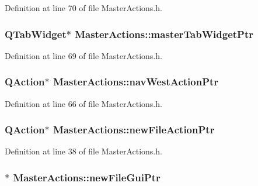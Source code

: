 Definition at line 70 of file Master\-Actions.\-h.

\hypertarget{class_master_actions_a774ef398053050c37d62b7a24e61c7ee}{
\subsubsection[{master\-Tab\-Widget\-Ptr}]{\setlength{\rightskip}{0pt plus 5cm}Q\-Tab\-Widget$\ast$ Master\-Actions\-::master\-Tab\-Widget\-Ptr\hspace{0.3cm}{\ttfamily [private]}}}\label{class_master_actions_a774ef398053050c37d62b7a24e61c7ee}


Definition at line 69 of file Master\-Actions.\-h.

\hypertarget{class_master_actions_af1e3c333e90f4763dfd964aa2321b034}{
\subsubsection[{nav\-West\-Action\-Ptr}]{\setlength{\rightskip}{0pt plus 5cm}Q\-Action$\ast$ Master\-Actions\-::nav\-West\-Action\-Ptr\hspace{0.3cm}{\ttfamily [private]}}}\label{class_master_actions_af1e3c333e90f4763dfd964aa2321b034}


Definition at line 66 of file Master\-Actions.\-h.

\hypertarget{class_master_actions_a4da658e527460b8d5b0a263820259e97}{
\subsubsection[{new\-File\-Action\-Ptr}]{\setlength{\rightskip}{0pt plus 5cm}Q\-Action$\ast$ Master\-Actions\-::new\-File\-Action\-Ptr\hspace{0.3cm}{\ttfamily [private]}}}\label{class_master_actions_a4da658e527460b8d5b0a263820259e97}


Definition at line 38 of file Master\-Actions.\-h.

\hypertarget{class_master_actions_a8839c174acf071c0d9bfe450160218eb}{
\subsubsection[{new\-File\-Gui\-Ptr}]{$\ast$ Master\-Actions\-::new\-File\-Gui\-Ptr\hspace{0.3cm}{\ttfamily [private]}}}\label{class_master_actions_a8839c174acf071c0d9bfe450160218eb}


